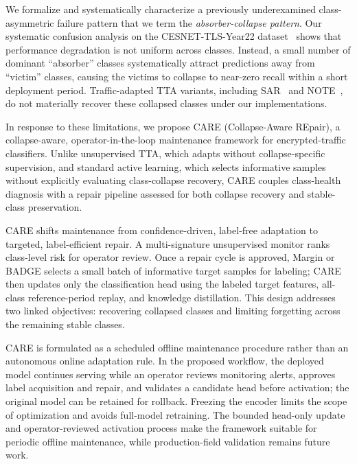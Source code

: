 \documentclass[preprint,12pt,authoryear]{elsarticle}
\let\cite\citep
\newcommand{\ours}{CARE}  %
\begin{document}
We formalize and systematically characterize a previously underexamined class-asymmetric failure pattern that we term the \textit{absorber-collapse pattern}.
Our systematic confusion analysis on the CESNET-TLS-Year22 dataset~\cite{hynek2024cesnet} shows that performance degradation is not uniform across classes.
Instead, a small number of dominant ``absorber'' classes systematically attract predictions away from ``victim'' classes, causing the victims to collapse to near-zero recall within a short deployment period.
Traffic-adapted TTA variants, including SAR~\cite{niu2023sar} and NOTE~\cite{gong2022note}, do not materially recover these collapsed classes under our implementations.

In response to these limitations, we propose \ours{} (Collapse-Aware REpair), a collapse-aware, operator-in-the-loop maintenance framework for encrypted-traffic classifiers.
Unlike unsupervised TTA, which adapts without collapse-specific supervision, and standard active learning, which selects informative samples without explicitly evaluating class-collapse recovery, \ours{} couples class-health diagnosis with a repair pipeline assessed for both collapse recovery and stable-class preservation.

\ours{} shifts maintenance from confidence-driven, label-free adaptation to targeted, label-efficient repair.
A multi-signature unsupervised monitor ranks class-level risk for operator review.
Once a repair cycle is approved, Margin or BADGE selects a small batch of informative target samples for labeling; \ours{} then updates only the classification head using the labeled target features, all-class reference-period replay, and knowledge distillation.
This design addresses two linked objectives: recovering collapsed classes and limiting forgetting across the remaining stable classes.

\ours{} is formulated as a scheduled offline maintenance procedure rather than an autonomous online adaptation rule.
In the proposed workflow, the deployed model continues serving while an operator reviews monitoring alerts, approves label acquisition and repair, and validates a candidate head before activation; the original model can be retained for rollback.
Freezing the encoder limits the scope of optimization and avoids full-model retraining.
The bounded head-only update and operator-reviewed activation process make the framework suitable for periodic offline maintenance, while production-field validation remains future work.
\end{document}
